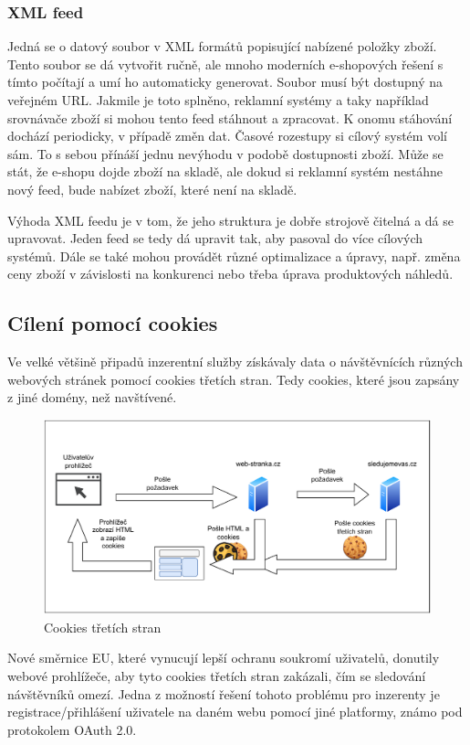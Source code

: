 \subsubsection{XML feed}
Jedná se o datový soubor v XML formátů popisující nabízené položky zboží. Tento soubor se dá vytvořit ručně, ale mnoho moderních e-shopových řešení
s tímto počítají a umí ho automaticky generovat. Soubor musí být dostupný na veřejném URL. Jakmile je toto splněno, reklamní systémy a taky například
srovnávače zboží si mohou tento feed stáhnout a zpracovat. K onomu stáhování dochází periodicky, v případě změn dat. Časové rozestupy si cílový systém
volí sám. To s sebou přínáší jednu nevýhodu v podobě dostupnosti zboží. Může se stát, že e-shopu dojde zboží na skladě, ale dokud si reklamní systém
nestáhne nový feed, bude nabízet zboží, které není na skladě.

Výhoda XML feedu je v tom, že jeho struktura je dobře strojově čitelná a dá se upravovat. Jeden feed se tedy dá upravit tak, aby pasoval do více
cílových systémů. Dále se také mohou provádět různé optimalizace a úpravy, např. změna ceny zboží v závislosti na konkurenci nebo třeba úprava produktových náhledů.

\subsection{Cílení pomocí cookies}
Ve velké většině připadů inzerentní služby získávaly data o návštěvnících různých webových stránek pomocí cookies třetích stran. Tedy cookies, které
jsou zapsány z jiné domény, než navštívené. 
\begin{figure}[h]
    \includegraphics[width=1.0\textwidth]{Figures/cookies.drawio.pdf}
    \caption{Cookies třetích stran}
    \label{fig:cookies}
\end{figure}
Nové směrnice EU, které vynucují lepší ochranu soukromí uživatelů, donutily webové prohlížeče, aby tyto cookies třetích stran zakázali, čím se sledování
návštěvníků omezí. Jedna z možností řešení tohoto problému pro inzerenty je registrace/přihlášení uživatele na daném webu pomocí jiné platformy, známo pod protokolem
OAuth 2.0.

